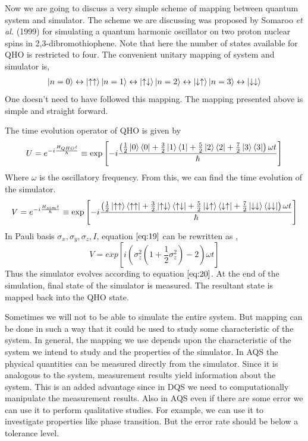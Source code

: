 \documentclass[12pt,a4paper]{report}
\begin{document}
Now we are going to discuss a very simple scheme of mapping between quantum system and simulator. The scheme we are discussing was proposed by Somaroo \emph{et al.} (1999)\cite{somaroo} for simulating a quantum harmonic oscillator on two proton nuclear spins in 2,3-dibromothiophene. Note that here the number of states available for QHO is restricted to four. The convenient unitary mapping of system and simulator is,
\begin{gather*}
\ket{n=0} \leftrightarrow \ket{\uparrow\uparrow}
\ket{n=1} \leftrightarrow \ket{\uparrow\downarrow}
\ket{n=2} \leftrightarrow \ket{\downarrow\uparrow}
\ket{n=3} \leftrightarrow \ket{\downarrow\downarrow}
\end{gather*}
One doesn’t need to have followed this mapping. The mapping presented above is simple and straight forward. \par
The time evolution operator of QHO is given by
\begin{equation}
U = e^{-i\frac{H_{\tiny QHO} t}{\hbar}} \equiv \exp\left[-i \frac{\left(\frac{1}{2}\ket{0}\bra{0} + \frac{3}{2}\ket{1}\bra{1} + \frac{5}{2}\ket{2}\bra{2} + \frac{7}{2}\ket{3}\bra{3}\right)\omega t}{\hbar}\right]
\end{equation}
Where $\omega$ is the oscillatory frequency. From this, we can find the time evolution of the simulator.
\begin{equation}
\label{eq:19}
V = e^{-i\frac{H_{sim} t}{\hbar}} \equiv \exp\left[-i\frac{\left(\frac{1}{2}\ket{\uparrow\uparrow}\bra{\uparrow\uparrow} + \frac{3}{2}\ket{\uparrow\downarrow}\bra{\uparrow\downarrow} + \frac{5}{2}\ket{\downarrow\uparrow}\bra{\downarrow\uparrow} + \frac{7}{2}\ket{\downarrow\downarrow}\bra{\downarrow\downarrow}\right)\omega t}{\hbar}\right]
\end{equation}
In Pauli basis ${\sigma_{x},\sigma_{y},\sigma_{z},I}$, equation $\ref{eq:19}$ can be rewritten as ,
\begin{equation}
\label{eq:20}
V = exp\left[i\left(\sigma_{z}^{2}(1 + \frac{1}{2}\sigma_{z}^{2}) - 2 \right)\omega t\right]
\end{equation} 
Thus the simulator evolves according to equation $\ref{eq:20}$. At the end of the simulation, final state of the simulator is measured. The resultant state is mapped back into the QHO state.\par

Sometimes we will not to be able to simulate the entire system. But mapping can be done in such a way that it could be used to study some characteristic of the system. In general, the mapping we use depends upon the characteristic of the system we intend to study and the properties of the simulator. In AQS the physical quantities can be measured directly from the simulator. Since it is analogous to the system, measurement results yield information about the system. This is an added advantage since in DQS we need to computationally manipulate the measurement results. Also in AQS even if there are some error we can use it to perform qualitative studies. For example, we can use it to investigate properties like phase transition. But the error rate should be below a tolerance level.
\end{document}
